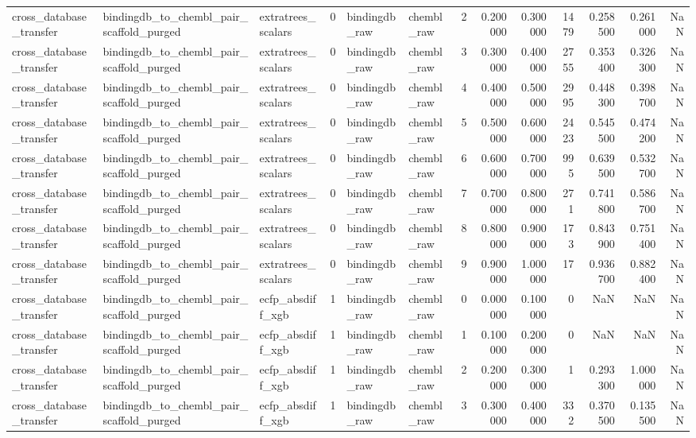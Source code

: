 \begin{longtable}{lllrllrrrrrrr}
cross\_database\_transfer & bindingdb\_to\_chembl\_pair\_scaffold\_purged & extratrees\_scalars & 0 & bindingdb\_raw & chembl\_raw & 2 & 0.200000 & 0.300000 & 1479 & 0.258500 & 0.261000 & NaN \\
cross\_database\_transfer & bindingdb\_to\_chembl\_pair\_scaffold\_purged & extratrees\_scalars & 0 & bindingdb\_raw & chembl\_raw & 3 & 0.300000 & 0.400000 & 2755 & 0.353400 & 0.326300 & NaN \\
cross\_database\_transfer & bindingdb\_to\_chembl\_pair\_scaffold\_purged & extratrees\_scalars & 0 & bindingdb\_raw & chembl\_raw & 4 & 0.400000 & 0.500000 & 2995 & 0.448300 & 0.398700 & NaN \\
cross\_database\_transfer & bindingdb\_to\_chembl\_pair\_scaffold\_purged & extratrees\_scalars & 0 & bindingdb\_raw & chembl\_raw & 5 & 0.500000 & 0.600000 & 2423 & 0.545500 & 0.474200 & NaN \\
cross\_database\_transfer & bindingdb\_to\_chembl\_pair\_scaffold\_purged & extratrees\_scalars & 0 & bindingdb\_raw & chembl\_raw & 6 & 0.600000 & 0.700000 & 995 & 0.639500 & 0.532700 & NaN \\
cross\_database\_transfer & bindingdb\_to\_chembl\_pair\_scaffold\_purged & extratrees\_scalars & 0 & bindingdb\_raw & chembl\_raw & 7 & 0.700000 & 0.800000 & 271 & 0.741800 & 0.586700 & NaN \\
cross\_database\_transfer & bindingdb\_to\_chembl\_pair\_scaffold\_purged & extratrees\_scalars & 0 & bindingdb\_raw & chembl\_raw & 8 & 0.800000 & 0.900000 & 173 & 0.843900 & 0.751400 & NaN \\
cross\_database\_transfer & bindingdb\_to\_chembl\_pair\_scaffold\_purged & extratrees\_scalars & 0 & bindingdb\_raw & chembl\_raw & 9 & 0.900000 & 1.000000 & 17 & 0.936700 & 0.882400 & NaN \\
cross\_database\_transfer & bindingdb\_to\_chembl\_pair\_scaffold\_purged & ecfp\_absdiff\_xgb & 1 & bindingdb\_raw & chembl\_raw & 0 & 0.000000 & 0.100000 & 0 & NaN & NaN & NaN \\
cross\_database\_transfer & bindingdb\_to\_chembl\_pair\_scaffold\_purged & ecfp\_absdiff\_xgb & 1 & bindingdb\_raw & chembl\_raw & 1 & 0.100000 & 0.200000 & 0 & NaN & NaN & NaN \\
cross\_database\_transfer & bindingdb\_to\_chembl\_pair\_scaffold\_purged & ecfp\_absdiff\_xgb & 1 & bindingdb\_raw & chembl\_raw & 2 & 0.200000 & 0.300000 & 1 & 0.293300 & 1.000000 & NaN \\
cross\_database\_transfer & bindingdb\_to\_chembl\_pair\_scaffold\_purged & ecfp\_absdiff\_xgb & 1 & bindingdb\_raw & chembl\_raw & 3 & 0.300000 & 0.400000 & 332 & 0.370500 & 0.135500 & NaN \\

\end{longtable}
